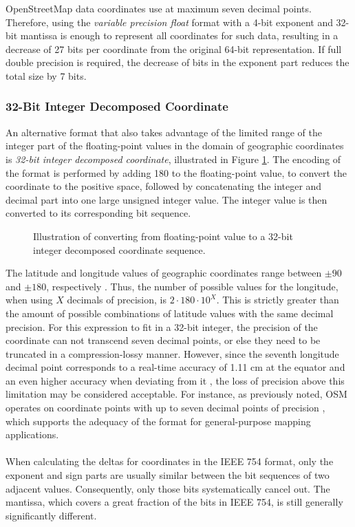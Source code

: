 OpenStreetMap data coordinates use at maximum seven decimal points. Therefore, using the \textit{variable precision float} format with a 4-bit exponent and 32-bit mantissa is enough to represent all coordinates for such data, resulting in a decrease of 27 bits per coordinate from the original 64-bit representation. If full double precision is required, the decrease of bits in the exponent part reduces the total size by 7 bits.


\subsubsection{32-Bit Integer Decomposed Coordinate}
\label{32-bit}
An alternative format that also takes advantage of the limited range of the integer part of the floating-point values in the domain of geographic coordinates is \textit{32-bit integer decomposed coordinate}, illustrated in Figure \ref{img:intdecompflow}. The encoding of the format is performed by adding 180 to the floating-point value, to convert the coordinate to the positive space, followed by concatenating the integer and decimal part into one large unsigned integer value. The integer value is then converted to its corresponding bit sequence.

\begin{figure}[htbp]
    \begin{adjustwidth}{15pt}{}
        
    \end{adjustwidth}

    \caption{Illustration of converting from floating-point value to a 32-bit integer decomposed coordinate sequence.}
    
    \label{img:intdecompflow}
\end{figure}

The latitude and longitude values of geographic coordinates range between \(\pm 90\) and \(\pm 180 \), respectively \cite{dec_deg}. Thus, the number of possible values for the longitude, when using \(X\) decimals of precision, is \(2 \cdot 180 \cdot 10^{X}\). This is strictly greater than the amount of possible combinations of latitude values with the same decimal precision. For this expression to fit in a 32-bit integer, the precision of the coordinate can not transcend seven decimal points, or else they need to be truncated in a compression-lossy manner. However, since the seventh longitude decimal point corresponds to a real-time accuracy of 1.11 cm at the equator and an even higher accuracy when deviating from it \cite{dec_deg}, the loss of precision above this limitation may be considered acceptable. For instance, as previously noted, OSM operates on coordinate points with up to seven decimal points of precision \cite{osm_precision}, which supports the adequacy of the format for general-purpose mapping applications.
\\\\
When calculating the deltas for coordinates in the IEEE 754 format, only the exponent and sign parts are usually similar between the bit sequences of two adjacent values. Consequently, only those bits systematically cancel out. The mantissa, which covers a great fraction of the bits in IEEE 754, is still generally significantly different.

